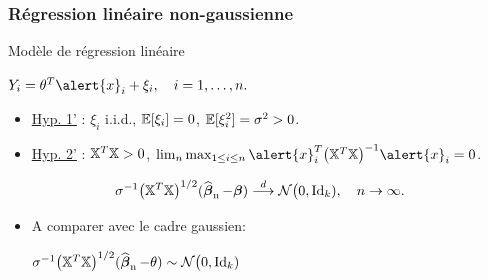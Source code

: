 \begin{frame}
\frametitle{Régression linéaire non-gaussienne} Modèle de
régression linéaire \vspace{3mm} \centerline{$ Y_i= \truetheta^T
\alert{x}_i+\xi_i, \quad i=1,\dots,n.$}

\vspace{-2mm}

\begin{itemize}
\item \underline{Hyp. 1'} : \alert{$\xi_i$ i.i.d., $\operatorname{{\mathbb E}}[\xi_i]
=0$, $\operatorname{{\mathbb E}}[\xi_i^2] = \sigma^2>0$.}
\item \underline{Hyp. 2'} : $\mathbb{X}^T \mathbb{X}>0$, \alert{$\lim_n\max_{1\le i \le n}\alert{x}_i^T
\big(\regressmat^T \regressmat\big)^{-1}\alert{x}_i =0$.}
\end{itemize}
\begin{prop}
$$
\sigma^{-1}\big(\mathbb{X}^T
\mathbb{X}\big)^{1/2}(\operatorname{\widehat{\boldsymbol{\beta}}_n}-\boldsymbol{\beta})\stackrel{d}{\longrightarrow}
{\mathcal N}\big(0, \mathrm{Id}_k), \quad n\to\infty.
$$
\end{prop}
\begin{itemize}
\item A comparer avec le cadre gaussien:\vspace{2mm}
\centerline{$\sigma^{-1}\big(\mathbb{X}^T
\mathbb{X}\big)^{1/2}(\operatorname{\widehat{\boldsymbol{\beta}}_n}-\theta)\sim {\mathcal N}\big(0,
\mathrm{Id}_k)$ }
\end{itemize}
\end{frame}


